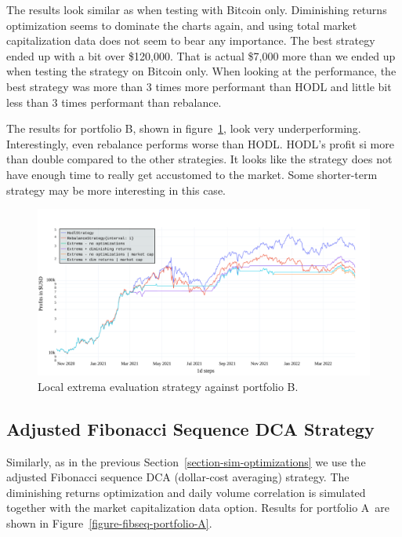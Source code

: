 The results look similar as when testing with Bitcoin only. Diminishing returns optimization seems to dominate the charts again, and using total market capitalization data does not seem to bear any importance. The best strategy ended up with a bit over \$120,000. That is actual \$7,000 more than we ended up when testing the strategy on Bitcoin only. When looking at the performance, the best strategy was more than 3 times more performant than HODL and little bit less than 3 times performant than rebalance.

The results for portfolio B, shown in figure~\ref{figure-extrema-portfolio-B}, look very underperforming. Interestingly, even rebalance performs worse than HODL. HODL's profit si more than double compared to the other strategies. It looks like the strategy does not have enough time to really get accustomed to the market. Some shorter-term strategy may be more interesting in this case.

\begin{figure}[!t]
    \centering
    \includegraphics[width=\columnwidth]{figures/extrema-portfolio-B.pdf}
    \caption{Local extrema evaluation strategy against portfolio B.}
    \label{figure-extrema-portfolio-B}
\end{figure}


\subsection*{Adjusted Fibonacci Sequence DCA Strategy}
Similarly, as in the previous Section~\ref{section-sim-optimizations} we use the adjusted Fibonacci sequence DCA (dollar-cost averaging) strategy. The diminishing returns optimization and daily volume correlation is simulated together with the market capitalization data option. Results for portfolio A~are shown in Figure~\ref{figure-fibseq-portfolio-A}.

